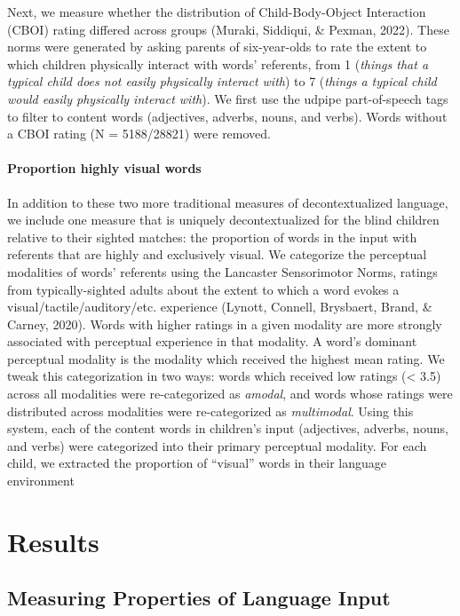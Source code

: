 \documentclass[
  man,floatsintext]{apa6}
\let\oldparagraph\paragraph
\renewcommand{\paragraph}[1]{\oldparagraph{#1}\mbox{}}
\begin{document}
Next, we measure whether the distribution of Child-Body-Object Interaction (CBOI) rating differed across groups (Muraki, Siddiqui, \& Pexman, 2022). These norms were generated by asking parents of six-year-olds to rate the extent to which children physically interact with words' referents, from 1 (\emph{things that a typical child does not easily physically interact with}) to 7 (\emph{things a typical child would easily physically interact with}). We first use the udpipe part-of-speech tags to filter to content words (adjectives, adverbs, nouns, and verbs). Words without a CBOI rating (N = 5188/28821) were removed.

\hypertarget{proportion-highly-visual-words}{%
\paragraph{Proportion highly visual words}\label{proportion-highly-visual-words}}

In addition to these two more traditional measures of decontextualized language, we include one measure that is uniquely decontextualized for the blind children relative to their sighted matches: the proportion of words in the input with referents that are highly and exclusively visual. We categorize the perceptual modalities of words' referents using the Lancaster Sensorimotor Norms, ratings from typically-sighted adults about the extent to which a word evokes a visual/tactile/auditory/etc. experience (Lynott, Connell, Brysbaert, Brand, \& Carney, 2020). Words with higher ratings in a given modality are more strongly associated with perceptual experience in that modality. A word's dominant perceptual modality is the modality which received the highest mean rating. We tweak this categorization in two ways: words which received low ratings (\textless{} 3.5) across all modalities were re-categorized as \emph{amodal}, and words whose ratings were distributed across modalities were re-categorized as \emph{multimodal}. Using this system, each of the content words in children's input (adjectives, adverbs, nouns, and verbs) were categorized into their primary perceptual modality. For each child, we extracted the proportion of ``visual'' words in their language environment

\hypertarget{results}{%
\section{Results}\label{results}}

\hypertarget{measuring-properties-of-language-input}{%
\subsection{Measuring Properties of Language Input}\label{measuring-properties-of-language-input}}
\end{document}
